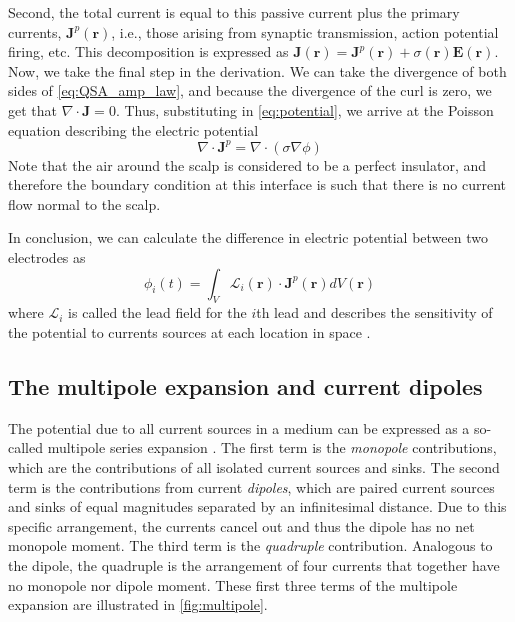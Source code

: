 Second, the total current is equal to this passive current plus the primary currents, $\bm{J}^p(\bm{r})$, i.e., those arising from synaptic transmission, action potential firing, etc. This decomposition is expressed as $\bm{J}(\bm{r}) = \bm{J}^p(\bm{r}) + \sigma(\bm{r}) \bm{E}(\bm{r})$. Now, we take the final step in the derivation. We can take the divergence of both sides of \ref{eq:QSA_amp_law}, and because the divergence of the curl is zero, we get that $\nabla \cdot \bm{J} = 0$. Thus, substituting in \ref{eq:potential}, we arrive at the Poisson equation describing the electric potential
\begin{equation} \label{eq:poisson}
    \nabla \cdot \bm{J}^p = \nabla \cdot \left(\sigma \nabla \phi \right)
\end{equation}
Note that the air around the scalp is considered to be a perfect insulator, and therefore the boundary condition at this interface is such that there is no current flow normal to the scalp.

In conclusion, we can calculate the difference in electric potential between two electrodes as \cite{RevModPhys.65.413}
\begin{equation}
    \phi_i(t) = \int_V \mathcal{L}_i(\bm{r}) \cdot \bm{J}^p(\bm{r}) dV(\bm{r})
\end{equation}
where $\mathcal{L}_i$ is called the lead field for the $i$th lead  and describes the sensitivity of the potential to currents sources at each location in space \cite{Malmivuo1995}.

\subsection{The multipole expansion and current dipoles} \label{sec:dipoles}
The potential due to all current sources in a medium can be expressed as a so-called multipole series expansion \cite{Nunez2006}. The first term is the \textit{monopole} contributions, which are the contributions of all isolated current sources and sinks. The second term is the contributions from current \textit{dipoles}, which are paired current sources and sinks of equal magnitudes separated by an infinitesimal distance. Due to this specific arrangement, the currents cancel out and thus the dipole has no net monopole moment. The third term is the \textit{quadruple} contribution. Analogous to the dipole, the quadruple is the arrangement of four currents that together have no monopole nor dipole moment. These first three terms of the multipole expansion are illustrated in \autoref{fig:multipole}. 


